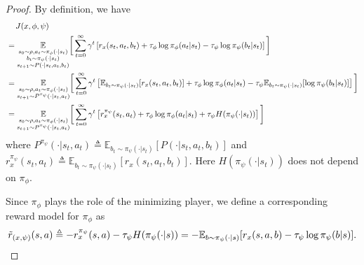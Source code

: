 \documentclass{article}
\theoremstyle{plain}
\theoremstyle{definition}
\theoremstyle{remark}
\def\E{\mathbb E}
\def\bydef{\triangleq}
\begin{document}
\begin{proof}
    By definition, we have
    \begin{align}
        & \quad \,J(x,\phi,\psi) \notag \\
        & = \underset{\substack{s_0 \sim \rho, a_t \sim \pi_\phi(\cdot|s_t) \\ b_t \sim \pi_\psi(\cdot|s_t) \\s_{t+1} \sim P(\cdot|s_t,a_t,b_t)}}{\mathbb{E}} \bigg[
            \sum_{t=0}^{\infty} \gamma^t \left[
                r_x(s_t,a_t,b_t) + \tau_\phi \log \pi_\phi(a_t|s_t) - \tau_\psi \log \pi_\psi(b_t|s_t)
            \right]   
        \bigg] \notag\\
        & = \underset{\substack{s_0 \sim \rho, a_t \sim \pi_\phi(\cdot|s_t) \\s_{t+1} \sim P^{\pi_\psi}(\cdot|s_t,a_t)}}{\mathbb{E}} \bigg[
            \sum_{t=0}^{\infty} \gamma^t \left[
                 \mathbb{E}_{b_t \sim \pi_\psi(\cdot|s_t)}[r_x(s_t,a_t,b_t)] + \tau_\phi \log \pi_\phi(a_t|s_t) -  \tau_\psi \E_{b_t \sim \pi_\psi(\cdot|s_t)}[\log \pi_\psi(b_t|s_t)]
            \right]   
        \bigg] \notag\\
        & = \underset{\substack{s_0 \sim \rho, a_t \sim \pi_\phi(\cdot|s_t) \\s_{t+1} \sim P^{\pi_\psi}(\cdot|s_t,a_t)}}{\mathbb{E}} \bigg[
            \sum_{t=0}^{\infty} \gamma^t \left[
                r^{\pi_\psi}_x(s_t,a_t) + \tau_\phi \log \pi_\phi(a_t|s_t) + \tau_\psi H(\pi_\psi(\cdot|s_t))
            \right]   
        \bigg] 
    \end{align}
    where $P^{\pi_\psi}(\cdot|s_t,a_t) \bydef \mathbb{E}_{b_t \sim \pi_\psi(\cdot|s_t)}[P(\cdot|s_t,a_t,b_t)]$ and $r^{\pi_\psi}_x(s_t,a_t) \bydef \mathbb{E}_{b_t \sim \pi_\psi(\cdot|s_t)}[r_x(s_t,a_t,b_t)]$. Here $H(\pi_\psi(\cdot|s_t))$ does not depend on $\pi_\phi$.

Since $\pi_\phi$ plays the role of the minimizing player, we define a corresponding reward model for $\pi_\phi$ as
    \begin{align}
        \tilde{r}_{(x,\psi)}(s,a) \bydef - r^{\pi_\psi}_x(s,a) - \tau_\psi H(\pi_\psi(\cdot|s)) = - \E_{b \sim \pi_\psi(\cdot|s)}[r_x(s,a,b) - \tau_\psi \log \pi_\psi(b|s)]. \notag
    \end{align}


\end{proof}
\end{document}
